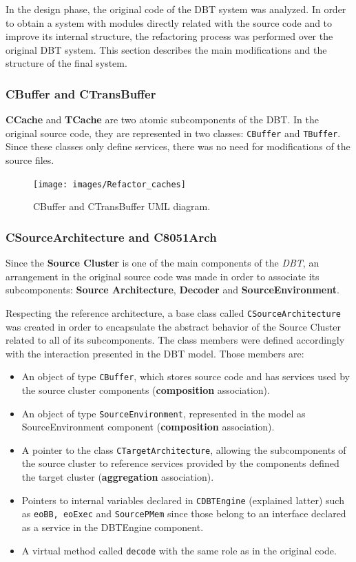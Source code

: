 In the design phase, the original code of the DBT system was analyzed. In order to obtain a system with modules directly related with the source code and to improve its internal structure, the refactoring process was performed over the original DBT system. This section describes the main modifications and the structure of the final system. 


\subsubsection*{CBuffer and CTransBuffer}

\textbf{CCache} and \textbf{TCache} are two atomic subcomponents of the DBT. In the original source code, they are represented in two classes: \texttt{CBuffer} and \texttt{TBuffer}. Since these classes only define services, there was no need for modifications of the source files.

\begin{figure}[H]
\centerline{
\texttt{[image: images/Refactor\_caches]}
}
\caption{CBuffer and CTransBuffer UML diagram.}
\label{fig:refactorcaches} 
\end{figure}


\subsubsection*{CSourceArchitecture and C8051Arch}

Since the \textbf{Source Cluster} is one of the main components of the \textit{DBT}, an arrangement in the original source code was made in order to associate its subcomponents: \textbf{Source Architecture}, \textbf{Decoder} and \textbf{SourceEnvironment}. 

Respecting the reference architecture, a base class called \texttt{CSourceArchitecture} was created in order to encapsulate the abstract behavior of the Source Cluster related to all of its subcomponents. The class members were defined accordingly with the interaction presented in the DBT model. Those members are:
\begin{itemize}
\item An object of type \texttt{CBuffer}, which stores source code and has services used by the source cluster components (\textbf{composition} association).
\item An object of type \texttt{SourceEnvironment}, represented in the model as SourceEnvironment component (\textbf{composition} association).
\item A pointer to the class \texttt{CTargetArchitecture}, allowing the subcomponents of the source cluster to reference services provided by the components defined the target cluster (\textbf{aggregation} association).
\item Pointers to internal variables declared in \texttt{CDBTEngine} (explained latter) such as \texttt{eoBB, eoExec} and \texttt{SourcePMem} since those belong to an interface declared as a service in the DBTEngine component.
\item A virtual method called \texttt{decode} with the same role as in the original code.
\end{itemize} 

